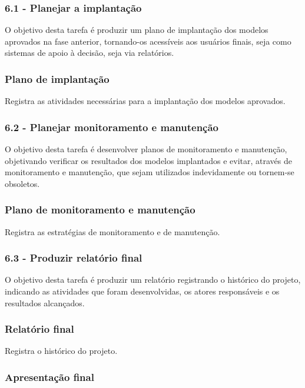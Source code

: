 \subsubsection*{\textbf{6.1 - Planejar a implantação}}

O objetivo desta tarefa é produzir um plano de implantação dos modelos aprovados na fase anterior, tornando-os acessíveis aos usuários finais, seja como sistemas de apoio à decisão, seja via relatórios.

\subsubsection*{Plano de implantação}

Registra as atividades necessárias para a implantação dos modelos aprovados.

\subsubsection*{\textbf{6.2 - Planejar monitoramento e manutenção}}

O objetivo desta tarefa é desenvolver planos de monitoramento e manutenção, objetivando verificar os resultados dos modelos implantados e evitar, através de monitoramento e manutenção, que sejam utilizados indevidamente ou tornem-se obsoletos.

\subsubsection*{Plano de monitoramento e manutenção}

Registra as estratégias de monitoramento e de manutenção.

\subsubsection*{\textbf{6.3 - Produzir relatório final}}

O objetivo desta tarefa é produzir um relatório registrando o histórico do projeto, indicando as atividades que foram desenvolvidas, os atores responsáveis e os resultados alcançados.

\subsubsection*{Relatório final}

Registra o histórico do projeto.

\subsubsection*{Apresentação final}

